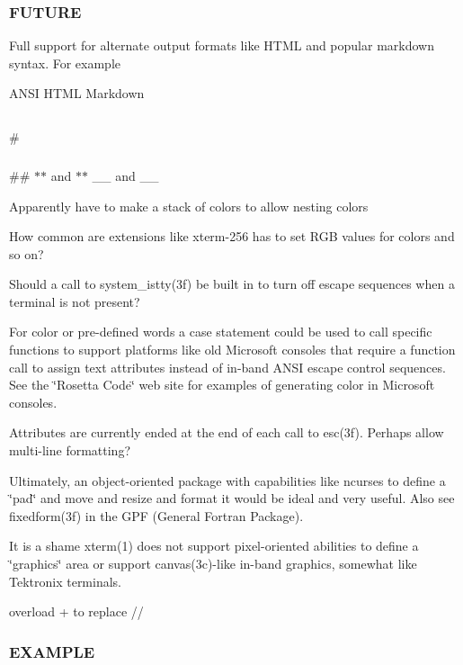 \subsubsection*{F\+U\+T\+U\+RE}

Full support for alternate output formats like H\+T\+ML and popular markdown syntax. For example

A\+N\+SI H\+T\+ML Markdown \subsection*{}

\# \subsubsection*{}

\#\# {\bfseries } $\ast$$\ast$ and $\ast$$\ast$ {\itshape } \+\_\+\+\_\+ and \+\_\+\+\_\+

Apparently have to make a stack of colors to allow nesting colors

How common are extensions like xterm-\/256 has to set R\+GB values for colors and so on?

Should a call to system\+\_\+istty(3f) be built in to turn off escape sequences when a terminal is not present?

For color or pre-\/defined words a case statement could be used to call specific functions to support platforms like old Microsoft consoles that require a function call to assign text attributes instead of in-\/band A\+N\+SI escape control sequences. See the \char`\"{}\+Rosetta Code\char`\"{} web site for examples of generating color in Microsoft consoles.

Attributes are currently ended at the end of each call to esc(3f). Perhaps allow multi-\/line formatting?

Ultimately, an object-\/oriented package with capabilities like ncurses to define a \char`\"{}pad\char`\"{} and move and resize and format it would be ideal and very useful. Also see fixedform(3f) in the G\+PF (General Fortran Package).

It is a shame xterm(1) does not support pixel-\/oriented abilities to define a \char`\"{}graphics\char`\"{} area or support canvas(3c)-\/like in-\/band graphics, somewhat like Tektronix terminals.

overload + to replace //

\subsubsection*{E\+X\+A\+M\+P\+LE}

